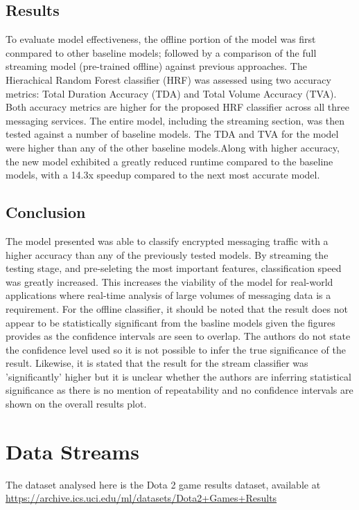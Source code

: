 \documentclass[10pt]{article}
\begin{document}
\subsection{Results}
To evaluate model effectiveness, the offline portion of the model was first conmpared to other baseline models; followed by a comparison of the full streaming model (pre-trained offline) against previous approaches. The Hierachical Random Forest classifier (HRF) was assessed using two accuracy metrics: Total Duration Accuracy (TDA) and Total Volume Accuracy (TVA). Both accuracy metrics are higher for the proposed HRF classifier across all three messaging services. 
The entire model, including the streaming section, was then tested against a number of baseline models. The TDA and TVA for the model were higher than any of the other baseline models.Along with higher accuracy, the new model exhibited a greatly reduced runtime compared to the baseline models, with a 14.3x speedup compared to the next most accurate model. 

\subsection{Conclusion}
The model presented was able to classify encrypted messaging traffic with a higher accuracy than any of the previously tested models. By streaming the testing stage, and pre-seleting the most important features, classification speed was greatly increased. This increases the viability of the model for real-world applications where real-time analysis of large volumes of messaging data is a requirement.
For the offline classifier, it should be noted that the result does not appear to be statistically significant from the basline models given the figures provides as the confidence intervals are seen to overlap. The authors do not state the confidence level used so it is not possible to infer the true significance of the result. Likewise,  it is stated that the result for the stream classifier was 'significantly' higher but it is unclear whether the authors are inferring statistical significance as there is no mention of repeatability and no confidence intervals are shown on the overall results plot.

\pagebreak


\section {Data Streams}

The dataset analysed here is the Dota 2 game results dataset, available at\\
\url{ https://archive.ics.uci.edu/ml/datasets/Dota2+Games+Results}
\end{document}
